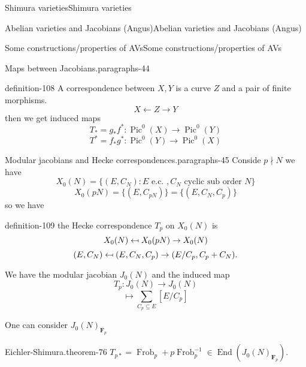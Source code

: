 \documentclass[10pt,]{book}
\numberwithin{equation}{section}
\newcommand{\inv}{^{-1}}
\providecommand\mapsfrom{\mathrel{\reflectbox{\ensuremath{\mapsto}}}}
\newcommand{\FF}{\mathbf{F}}
\DeclareMathOperator{\End}{End}
\DeclareMathOperator{\Pic}{Pic}
\DeclareMathOperator{\Frob}{Frob}
\begin{document}
\begin{chapterptx}{Shimura varieties}{}{Shimura varieties}{}{}
\begin{sectionptx}{Abelian varieties and Jacobians (Angus)}{}{Abelian varieties and Jacobians (Angus)}{}{}
\begin{subsectionptx}{Some constructions/properties of AVs}{}{Some constructions/properties of AVs}{}{}
\begin{paragraphs}{Maps between Jacobians.}{paragraphs-44}
\begin{definition}{}{definition-108}
\hypertarget{p-1118}{}%
A correspondence between \(X,Y\) is a curve \(Z\) and a pair of finite morphisms.%
\begin{equation*}
X \leftarrow Z \to Y
\end{equation*}
then we get induced maps%
\begin{equation*}
T_* = g_* f^* \colon \Pic^0(X) \to \Pic^0(Y)
\end{equation*}
%
\begin{equation*}
T^* = f_* g^* \colon \Pic^0(Y) \to \Pic^0(X)
\end{equation*}
%
\end{definition}
\end{paragraphs}%
\begin{paragraphs}{Modular jacobians and Hecke correspondences.}{paragraphs-45}%
\hypertarget{p-1119}{}%
Conside \(p\nmid N\) we have%
\begin{equation*}
X_0(N) = \{ (E,C_N) : E\text{ e.c. }, C_N \text{ cyclic sub order } N\}
\end{equation*}
%
\begin{equation*}
X_0(pN) = \{(E,C_{pN})\} = \{(E,C_N,C_p)\}
\end{equation*}
so we have%
\begin{definition}{}{definition-109}%
\hypertarget{p-1120}{}%
the Hecke correspondence \(T_p\) on \(X_0(N)\) is%
\begin{equation*}
X_0(N) \mapsfrom X_0(pN) \to X_0(N)
\end{equation*}
%
\begin{equation*}
(E,C_N)\mapsfrom (E,C_N,C_p)\to (E/C_p, C_p + C_N)\text{.}
\end{equation*}
%
\end{definition}
\hypertarget{p-1121}{}%
We have the modular jacobian \(J_0(N)\) and the induced map%
\begin{equation*}
T_p \colon J_0(N) \to J_0(N)
\end{equation*}
%
\begin{equation*}
[E] \mapsto \sum_{C_p \subseteq E} [E/C_p]
\end{equation*}
%
\par
\hypertarget{p-1122}{}%
One can consider \(J_0(N)_{\FF_p}\)%
\begin{theorem}{Eichler-Shimura.}{}{theorem-76}%
\hypertarget{p-1123}{}%
\(T_{p*} = \Frob_p + p \Frob_p\inv \in \End(J_0(N)_{\FF_p})\).%
\end{theorem}
\end{paragraphs}%
\end{subsectionptx}

\end{sectionptx}
\end{chapterptx}
\end{document}
